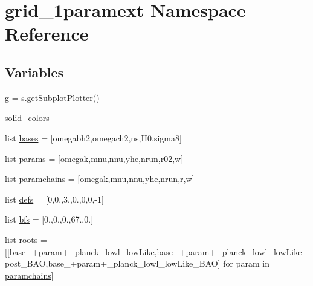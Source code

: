 \hypertarget{namespacegrid__1paramext}{}\section{grid\+\_\+1paramext Namespace Reference}
\label{namespacegrid__1paramext}
\subsection*{Variables}
\begin{DoxyCompactItemize}
\item 
\mbox{\hyperlink{namespacegrid__1paramext_a897331d00eb38a2d2d45c5d2d42e9913}{g}} = s.\+get\+Subplot\+Plotter()
\item 
\mbox{\hyperlink{namespacegrid__1paramext_a4bcab63def90f96b5a6b44f18ea3e47b}{solid\+\_\+colors}}
\item 
list \mbox{\hyperlink{namespacegrid__1paramext_a1ed7dc2e9209eb45af7662ac2820677f}{bases}} = \mbox{[}\textquotesingle{}omegabh2\textquotesingle{},\textquotesingle{}omegach2\textquotesingle{},\textquotesingle{}ns\textquotesingle{},\textquotesingle{}H0\textquotesingle{},\textquotesingle{}sigma8\textquotesingle{}\mbox{]}
\item 
list \mbox{\hyperlink{namespacegrid__1paramext_ab1b06985f22a35a6120d5f8804241717}{params}} = \mbox{[}\textquotesingle{}omegak\textquotesingle{},\textquotesingle{}mnu\textquotesingle{},\textquotesingle{}nnu\textquotesingle{},\textquotesingle{}yhe\textquotesingle{},\textquotesingle{}nrun\textquotesingle{},\textquotesingle{}r02\textquotesingle{},\textquotesingle{}w\textquotesingle{}\mbox{]}
\item 
list \mbox{\hyperlink{namespacegrid__1paramext_ae777359a93a59db6706c4a5899c86727}{paramchains}} = \mbox{[}\textquotesingle{}omegak\textquotesingle{},\textquotesingle{}mnu\textquotesingle{},\textquotesingle{}nnu\textquotesingle{},\textquotesingle{}yhe\textquotesingle{},\textquotesingle{}nrun\textquotesingle{},\textquotesingle{}r\textquotesingle{},\textquotesingle{}w\textquotesingle{}\mbox{]}
\item 
list \mbox{\hyperlink{namespacegrid__1paramext_ac245a8ad286cd0cf33d8448424b75ac5}{defs}} = \mbox{[}0,0.,3.,0.,0,0,-\/1\mbox{]}
\item 
list \mbox{\hyperlink{namespacegrid__1paramext_a6f95bc425ea208e432ffec920ed83d15}{bfs}} = \mbox{[}0.,0.,0.,67.,0.\mbox{]}
\item 
list \mbox{\hyperlink{namespacegrid__1paramext_aa7171bf862214d520bf9f13c6587414c}{roots}} = \mbox{[}\mbox{[}\textquotesingle{}base\+\_\+\textquotesingle{}+param+\textquotesingle{}\+\_\+planck\+\_\+lowl\+\_\+low\+Like\textquotesingle{},\textquotesingle{}base\+\_\+\textquotesingle{}+param+\textquotesingle{}\+\_\+planck\+\_\+lowl\+\_\+low\+Like\+\_\+post\+\_\+\+B\+AO\textquotesingle{},\textquotesingle{}base\+\_\+\textquotesingle{}+param+\textquotesingle{}\+\_\+planck\+\_\+lowl\+\_\+low\+Like\+\_\+\+B\+AO\textquotesingle{}\mbox{]} for param in \mbox{\hyperlink{namespacegrid__1paramext_ae777359a93a59db6706c4a5899c86727}{paramchains}}\mbox{]}

\end{DoxyCompactItemize}
